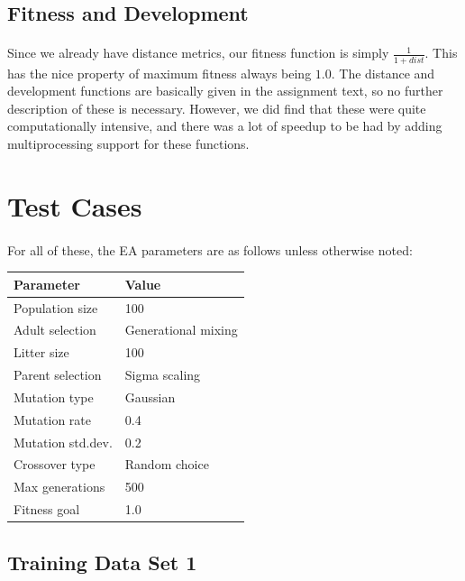 \documentclass[a4paper,12pt]{article}
\begin{document}
\subsection{Fitness and Development}

\paragraph{}Since we already have distance metrics, our fitness function is simply $\frac{1}{1+dist}$. This has the nice property of maximum fitness always being $1.0$. The distance and development functions are basically given in the assignment text, so no further description of these is necessary. However, we did find that these were quite computationally intensive, and there was a lot of speedup to be had by adding multiprocessing support for these functions.

\section{Test Cases}

\paragraph{}For all of these, the EA parameters are as follows unless otherwise noted:\\

\begin{tabular}{ll}
\hline
Parameter & Value \\
\hline \hline
Population size & 100 \\
Adult selection & Generational mixing \\
Litter size & 100 \\
Parent selection & Sigma scaling \\
Mutation type & Gaussian \\
Mutation rate & 0.4 \\
Mutation std.dev. & 0.2 \\
Crossover type & Random choice \\
Max generations & 500 \\
Fitness goal & 1.0 \\
\hline
\end{tabular}

\subsection{Training Data Set 1}
\end{document}
